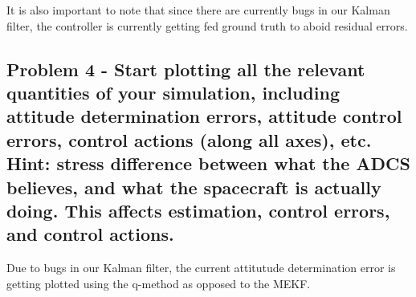 It is also important to note that since there are currently bugs in our Kalman filter, the controller is currently getting fed ground truth to aboid residual errors.


\subsection{Problem 4 - Start plotting all the relevant quantities of your simulation, including attitude determination errors, attitude control errors, control actions (along all axes), etc. Hint: stress difference between what the ADCS believes, and what the spacecraft is actually doing. This affects estimation, control errors, and control actions.}

Due to bugs in our Kalman filter, the current attitutude determination error is getting plotted using the q-method as opposed to the MEKF.